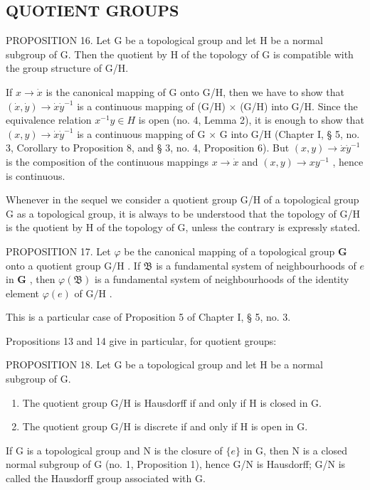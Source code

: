 \subsection{QUOTIENT GROUPS}

PROPOSITION 16. Let G be a topological group and let H be a normal subgroup of G. Then the quotient by H of the topology of G is compatible with the group structure of G/H.

If \(x \to \dot{x}\) is the canonical mapping of G onto G/H, then we have to show that \((\dot{x}, \dot{y}) \to \dot{x}\dot{y}^{-1}\) is a continuous mapping of (G/H) \(\times\) (G/H) into G/H. Since the equivalence relation \(x^{-1}y \in H\) is open (no. 4, Lemma 2), it is enough to show that \((x,y) \to \dot{x}\dot{y}^{-1}\) is a continuous mapping of G \(\times\) G into G/H (Chapter I, § 5, no. 3, Corollary to Proposition 8, and § 3, no. 4, Proposition 6). But \((x,y) \to \dot{x}\dot{y}^{-1}\) is the composition of the continuous mappings \(x \to \dot{x}\) and \((x,y) \to xy^{-1}\) , hence is continuous.

Whenever in the sequel we consider a quotient group G/H of a topological group G as a topological group, it is always to be understood that the topology of G/H is the quotient by H of the topology of G, unless the contrary is expressly stated.

PROPOSITION 17. Let \(\varphi\) be the canonical mapping of a topological group \(\mathbf{G}\) onto a quotient group \(\mathrm{G / H}\) . If \(\mathfrak{B}\) is a fundamental system of neighbourhoods of \(e\) in \(\mathbf{G}\) , then \(\varphi(\mathfrak{B})\) is a fundamental system of neighbourhoods of the identity element \(\varphi(e)\) of \(\mathrm{G / H}\) .

This is a particular case of Proposition 5 of Chapter I, § 5, no. 3.

Propositions 13 and 14 give in particular, for quotient groups:

PROPOSITION 18. Let G be a topological group and let H be a normal subgroup of G.

\begin{enumerate}
\def\labelenumi{\alph{enumi})}
\item
  The quotient group G/H is Hausdorff if and only if H is closed in G.
\item
  The quotient group G/H is discrete if and only if H is open in G.
\end{enumerate}

If G is a topological group and N is the closure of \(\{e\}\) in G, then N is a closed normal subgroup of G (no. 1, Proposition 1), hence G/N is Hausdorff; G/N is called the Hausdorff group associated with G.

